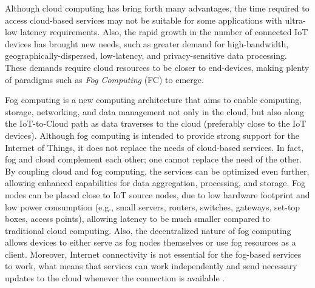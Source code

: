 \noindent\tab Although cloud computing has bring forth many advantages, the time required to access cloud-based services may not be suitable for some applications with ultra-low latency requirements. Also, the rapid growth in the number of connected IoT devices has brought new needs, such as greater demand for high-bandwidth, geographically-dispersed, low-latency, and privacy-sensitive data processing. These demands require cloud resources to be closer to end-devices, making plenty of paradigms such as \textit{Fog Computing} (FC) to emerge. %

\noindent\tab Fog computing is a new computing architecture that aims to enable computing, storage, networking, and data management not only in the cloud, but also along the IoT-to-Cloud path as data traverses to the cloud (preferably close to the IoT devices). Although fog computing is intended to provide strong support for the Internet of Things, it does not replace the needs of cloud-based services. In fact, fog and cloud complement each other; one cannot replace the need of the other. By coupling cloud and fog computing, the services can be optimized even further, allowing enhanced capabilities for data aggregation, processing, and storage. Fog nodes can be placed close to IoT source nodes, due to low hardware footprint and low power consumption (e.g., small servers, routers, switches, gateways, set-top boxes, access points), allowing latency to be much smaller compared to traditional cloud computing. Also, the decentralized nature of fog computing allows devices to either serve as fog nodes themselves or use fog resources as a client. Moreover, Internet connectivity is not essential for the fog-based services to work, what means that services can work independently and send necessary updates to the cloud whenever the connection is available \cite{yousefpour2018all}.

